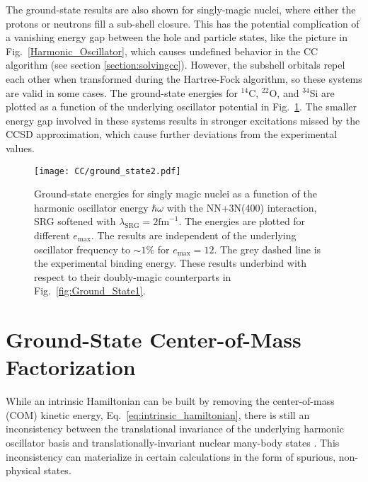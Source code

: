 \documentclass[thesis.tex]{subfiles}
\begin{document}
The ground-state results are also shown for singly-magic nuclei, where either the protons or neutrons fill a sub-shell closure.  This has the potential complication of a vanishing energy gap between the hole and particle states, like the picture in Fig.\ \ref{Harmonic_Oscillator}, which causes undefined behavior in the CC algorithm (see section \ref{section:solvingcc}).  However, the subshell orbitals repel each other when transformed during the Hartree-Fock algorithm, so these systems are valid in some cases.  The ground-state energies for ${}^{14}$C, ${}^{22}$O, and ${}^{34}$Si are plotted as a function of the underlying oscillator potential in Fig.\ \ref{fig:Ground_State2}.  The smaller energy gap involved in these systems results in stronger excitations missed by the CCSD approximation, which cause further deviations from the experimental values.
\begin{figure}[h!]
  \centering
  \texttt{[image: CC/ground\_state2.pdf]}
  \caption{Ground-state energies for singly magic nuclei as a function of the harmonic oscillator energy $\hbar\omega$ with the NN+3N(400) interaction, SRG softened with $\lambda_{\mathrm{SRG}}=2\mathrm{fm}^{-1}$.  The energies are plotted for different $e_\mathrm{max}$.  The results are independent of the underlying oscillator frequency to $\sim 1\%$ for $e_\mathrm{max}=12$.  The grey dashed line is the experimental binding energy.  These results underbind with respect to their doubly-magic counterparts in Fig.\ \ref{fig:Ground_State1}.}
  \label{fig:Ground_State2}
\end{figure}

\section{Ground-State Center-of-Mass Factorization} \label{section:CoM}
While an intrinsic Hamiltonian can be built by removing the center-of-mass (COM) kinetic energy, Eq.\ \eqref{eq:intrinsic_hamiltonian}, there is still an inconsistency between the translational invariance of the underlying harmonic oscillator basis and translationally-invariant nuclear many-body states \cite{LIPKIN1958,GLOECKNER1974313}.  This inconsistency can materialize in certain calculations in the form of spurious, non-physical states.
\end{document}

